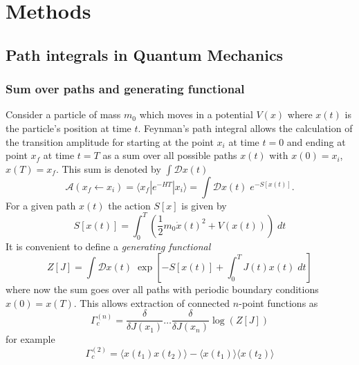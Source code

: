 \documentclass[11pt]{article}
\begin{document}
\section{Methods}
\subsection{Path integrals in Quantum Mechanics}
\subsubsection{Sum over paths and generating functional}
Consider a particle of mass $m_0$ which moves in a potential $V(x)$ where $x(t)$ is the particle's position at time $t$.
Feynman's path integral allows the calculation of the transition amplitude for starting at the point $x_i$ at time $t=0$ and ending at point $x_f$ at time $t=T$ as a sum over all possible paths $x(t)$ with $x(0)=x_i$,  $x(T)=x_f$. This sum is denoted by $\int \mathcal{D}x(t)$
\begin{equation}
  \mathcal{A}(x_f\leftarrow x_i)=\langle x_f| e^{-HT} |x_i\rangle = \int\mathcal{D}x(t)\;e^{-S[x(t)]}.
\end{equation}
For a given path $x(t)$ the action $S[x]$ is given by
\begin{equation}
  S[x(t)] = \int_{0}^{T} \left(\frac{1}{2}m_0 \dot{x}(t)^2 + V(x(t))\right)\;dt
\end{equation}
It is convenient to define a \textit{generating functional}
\begin{equation}
  Z[J] = \int \mathcal{D}x(t)\;\exp\left[-S[x(t)]+\int_0^T J(t)x(t)\;dt \right]\label{eqn:generating_functional_cont}
\end{equation}
where now the sum goes over all paths with periodic boundary conditions $x(0)=x(T)$. This allows extraction of connected $n$-point functions as
\begin{equation}
  \Gamma_c^{(n)} = \frac{\delta}{\delta J(x_1)}\dots\frac{\delta}{\delta J(x_n)} \log\left(Z[J]\right)
\end{equation}
for example
\begin{equation}
  \Gamma_c^{(2)} = \langle x(t_1)x(t_2)\rangle - \langle x(t_1)\rangle \langle x(t_2)\rangle
\end{equation}
\end{document}
